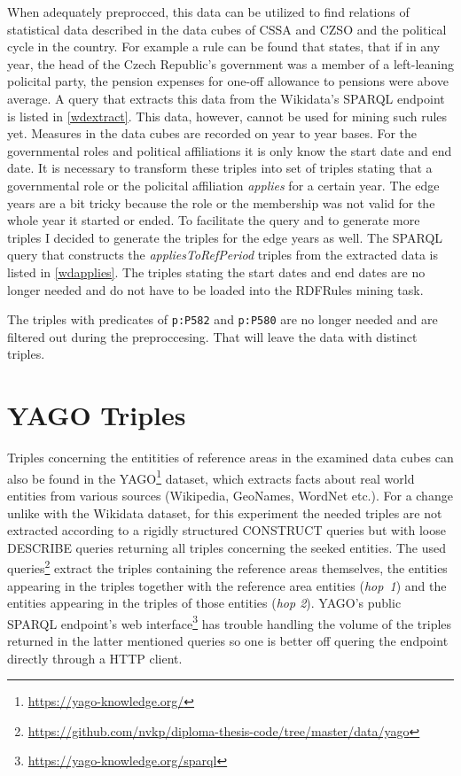 When adequately preprocced, this data can be utilized to find relations of statistical data described in the data cubes of CSSA and CZSO and the political cycle in the country. For example a rule can be found that states, that if in any year, the head of the Czech Republic's government was a member of a left-leaning policital party, the pension expenses for one-off allowance to pensions were above average. A query that extracts this data from the Wikidata's SPARQL endpoint is listed in \ref{wdextract}. This data, however, cannot be used for mining such rules yet. Measures in the data cubes are recorded on year to year bases. For the governmental roles and political affiliations it is only know the start date and end date. It is necessary to transform these triples into set of triples stating that a governmental role or the policital affiliation \textit{applies} for a certain year. The edge years are a bit tricky because the role or the membership was not valid for the whole year it started or ended. To facilitate the query and to generate more triples I decided to generate the triples for the edge years as well. The SPARQL query that constructs the \textit{appliesToRefPeriod} triples from the extracted data is listed in \ref{wdapplies}. The triples stating the start dates and end dates are no longer needed and do not have to be loaded into the RDFRules mining task.

The triples with predicates of \verb|p:P582| and \verb|p:P580| are no longer needed and are filtered out during the preproccesing. That will leave the data with  distinct triples.

\section{YAGO Triples}

Triples concerning the entitities of reference areas in the examined data cubes can also be found in the YAGO\footnote{\href{https://yago-knowledge.org/}{https://yago-knowledge.org/}} dataset, which extracts facts about real world entities from various sources (Wikipedia, GeoNames, WordNet etc.). For a change unlike with the Wikidata dataset, for this experiment the needed triples are not extracted according to a rigidly structured CONSTRUCT queries but with loose DESCRIBE queries returning all triples concerning the seeked entities. The used queries\footnote{\href{https://github.com/nvkp/diploma-thesis-code/tree/master/data/yago}{https://github.com/nvkp/diploma-thesis-code/tree/master/data/yago}} extract the triples containing the reference areas themselves, the entities appearing in the triples together with the reference area entities (\textit{hop~1}) and the entities appearing in the triples of those entities (\textit{hop 2}). YAGO's public SPARQL endpoint's web interface\footnote{\href{https://yago-knowledge.org/sparql}{https://yago-knowledge.org/sparql}} has trouble handling the volume of the triples returned in the latter mentioned queries so one is better off quering the endpoint directly through a HTTP client.


